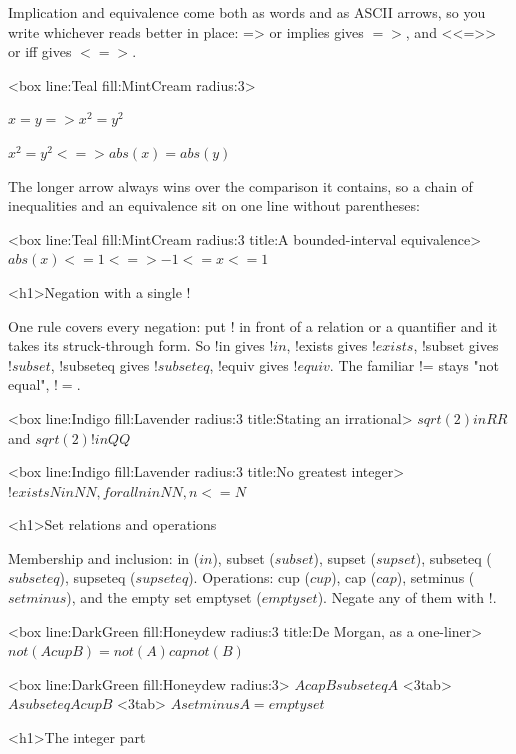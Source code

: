 \documentclass[
  margins=8,
  font=Latin Modern Roman,
  size=12,
  linespread=1.4,
  lang=en
]{scholatex}
\begin{document}
Implication and equivalence come both as words and as ASCII arrows, so you
write whichever reads better in place: => or implies gives $=>$,
and <<=>> or iff gives $<=>$.

<box line:Teal fill:MintCream radius:3>{
	$x = y => x^2 = y^2$

	$x^2 = y^2 <=> abs(x) = abs(y)$
}

The longer arrow always wins over the comparison it contains, so a chain of
inequalities and an equivalence sit on one line without parentheses:

<box line:Teal fill:MintCream radius:3 title:{A bounded-interval equivalence}>{
	$abs(x) <= 1 <=> -1 <= x <= 1$
}

<h1>Negation with a single !

One rule covers every negation: put ! in front of a relation or a
quantifier and it takes its struck-through form. So !in gives $!in$,
!exists gives $!exists$, !subset gives $!subset$, !subseteq
gives $!subseteq$, !equiv gives $!equiv$. The familiar != stays
"not equal", $!=$.

<box line:Indigo fill:Lavender radius:3 title:{Stating an irrational}>{
	$sqrt(2) in RR$ and $sqrt(2) !in QQ$
}

<box line:Indigo fill:Lavender radius:3 title:{No greatest integer}>{
	$!exists N in NN, forall n in NN, n <= N$
}

<h1>Set relations and operations

Membership and inclusion: in ($in$), subset ($subset$), supset
($supset$), subseteq ($subseteq$), supseteq ($supseteq$). Operations:
cup ($cup$), cap ($cap$), setminus ($setminus$), and the empty set
emptyset ($emptyset$). Negate any of them with !.

<box line:DarkGreen fill:Honeydew radius:3 title:{De Morgan, as a one-liner}>{
	$not(A cup B) = not(A) cap not(B)$
}

<box line:DarkGreen fill:Honeydew radius:3>{
	$A cap B subseteq A$ <3tab> $A subseteq A cup B$ <3tab> $A setminus A = emptyset$
}

<h1>The integer part
\end{document}
